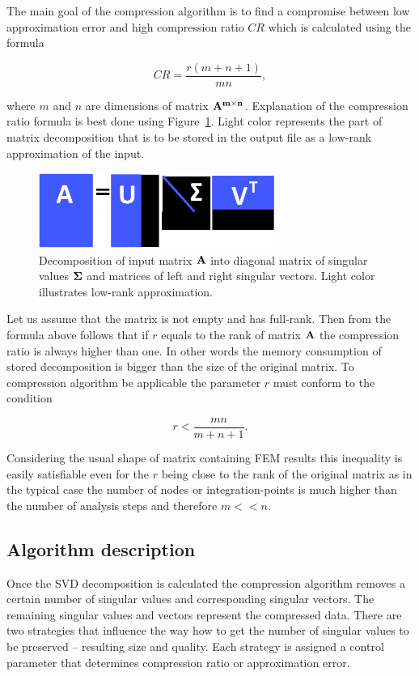 The main goal of the compression algorithm is to find a compromise between low approximation error and high compression ratio $CR$ which is calculated using the formula

\begin{equation}
CR=\frac{r(m+n+1)}{m n},
\label{eq:cr-def}
\end{equation}

where $m$ and $n$ are dimensions of matrix $\mathbf{A^{m \times n}}$. Explanation of the compression ratio formula is best done using Figure~\ref{fig:lowrank_svd}. Light color represents the part of matrix decomposition that is to be stored in the output file as a low-rank approximation of the input.

\begin{figure}[H]
\centering\includegraphics[width=0.7\textwidth]{figures/low_rank_decomposition_diagram}
\caption{Decomposition of input matrix $\mathbf{A}$ into diagonal matrix of singular values $\mathbf{\Sigma}$ and matrices of left and right singular vectors. Light color illustrates low-rank approximation.}
\label{fig:lowrank_svd}
\end{figure}

Let us assume that the matrix is not empty and has full-rank. Then from the formula above follows that if $r$ equals to the rank of matrix $\mathbf{A}$ the compression ratio is always higher than one. In other words the memory consumption of stored decomposition is bigger than the size of the original matrix. To compression algorithm be applicable the parameter $r$ must conform to the condition

$$r<\frac{m n}{m+n+1}.$$

Considering the usual shape of matrix containing FEM results this inequality is easily satisfiable even for the $r$ being close to the rank of the original matrix as in the typical case the number of nodes or integration-points is much higher than the number of analysis steps and therefore $m<<n$.

\subsection{Algorithm description}
Once the SVD decomposition is calculated the compression algorithm removes a certain number of singular values and corresponding singular vectors. The remaining singular values and vectors represent the compressed data. There are two strategies that influence the way how to get the number of singular values to be preserved -- resulting size and quality. Each strategy is assigned a control parameter that determines compression ratio or approximation error.

